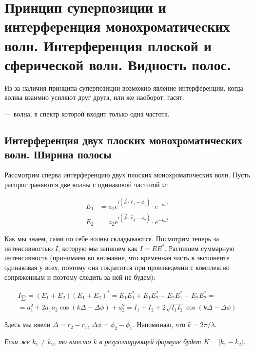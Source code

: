 \section{Принцип суперпозиции и интерференция монохроматических волн. Интерференция плоской и сферической волн. Видность полос.}


Из-за наличия принципа суперпозиции возможно явление интерференции, когда волны взаимно усиляют друг друга, или же наоборот, гасят.

 --- волна, в спектр которой входит только одна частота.

\subsection{Интерференция двух плоских монохроматических волн. Ширина полосы}

Рассмотрим сперва интерференцию двух плоских монохроматических волн. Пусть распространяются две волны с одинаковой частотой $\omega$:

\begin{align*}
	E_1 &= a_1 e^{i(\vec{k}\cdot \vec{r}_1 - \phi_1)} \cdot e^{-i\omega t}\\
	E_2 &= a_2 e^{i(\vec{k}\cdot \vec{r}_2 - \phi_2)} \cdot e^{-i\omega t}
\end{align*}

Как мы знаем, сами по себе волны складываются. Посмотрим теперь за интенсивностью $I$, которую мы запишем как $I = E E^*$. Распишем суммарную интенсивность (принимаем во внимание, что временная часть в экспоненте одинаковая у всех, поэтому она сократится при произведении с комплексно сопряженным и поэтому следить за ней не будем):

\begin{align*}
	I_{\sum} = (E_1 + E_2) (E_1 + E_2)^* = E_1 E_1^* + E_1 E_2^* + E_2 E_1^* + E_2 E_2^* = \\
	= a_1^2 + 2 a_1 a_2 \cos(k \Delta - \Delta\phi) + a_2^2 = I_1 + I_2 + 2 \sqrt{I_1 I_2} \cos(k \Delta - \Delta\phi)
\end{align*}

Здесь мы ввели $\Delta = r_2 - r_1$, $\Delta\phi = \phi_2 - \phi_1$. Напоминаю, что $k = 2\pi / \lambda$.

\textit{Если же $k_1 \ne k_2$, то вместо $k$ в результирующей формуле будет $K = |k_1 - k_2|$.}


